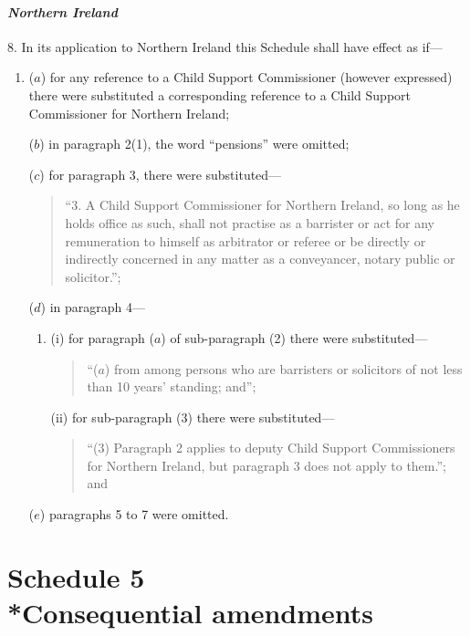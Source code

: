 \documentclass[12pt,a4paper]{article}
\begin{document}

\subsection*{\itshape Northern Ireland}

8. In its application to Northern Ireland this Schedule shall have effect as if—
\begin{enumerate}\item[]
($a$) for any reference to a Child Support Commissioner (however expressed) there were substituted a corresponding reference to a Child Support Commissioner for Northern Ireland;

($b$) in paragraph 2(1), the word “pensions” were omitted;

($c$) for paragraph 3, there were substituted—
\begin{quotation}
“3. A Child Support Commissioner for Northern Ireland, so long as he holds office as such, shall not practise as a barrister or act for any remuneration to himself as arbitrator or referee or be directly or indirectly concerned in any matter as a conveyancer, notary public or solicitor.”;
\end{quotation}

($d$) in paragraph 4—
\begin{enumerate}\item[]
(i) for paragraph ($a$)  of sub-paragraph (2)  there were substituted—
\begin{quotation}
“($a$) from among persons who are barristers or solicitors of not less than 10 years' standing; and”;
\end{quotation}

(ii) for sub-paragraph (3)  there were substituted—
\begin{quotation}
“(3) Paragraph 2 applies to deputy Child Support Commissioners for Northern Ireland, but paragraph 3 does not apply to them.”; and
\end{quotation}
\end{enumerate}

($e$) paragraphs 5 to 7 were omitted.
\end{enumerate}

\part[Schedule 5 --- Consequential amendments]{Schedule 5\\*Consequential amendments}
\end{document}
